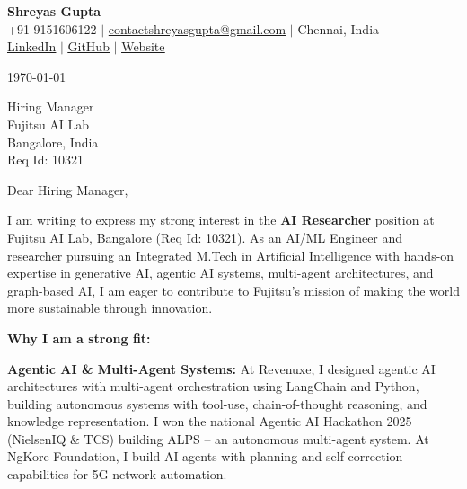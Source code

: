 \documentclass[11pt,letterpaper]{article}
\begin{document}
\begin{center}
    \textbf{\Large Shreyas Gupta} \\
    \vspace{4pt}
    +91 9151606122 $|$ \href{mailto:contactshreyasgupta@gmail.com}{contactshreyasgupta@gmail.com} $|$ Chennai, India \\
    \href{https://www.linkedin.com/in/contact-shreyas/}{\underline{LinkedIn}} $|$
    \href{https://github.com/contact-shreyas}{\underline{GitHub}} $|$
    \href{https://shreyas-gupta-portfolio-bvjtwuqfa-shreyas-projects-6592f999.vercel.app/}{\underline{Website}}
\end{center}

\vspace{14pt}

\noindent \today \\

\vspace{8pt}

\noindent Hiring Manager \\
Fujitsu AI Lab \\
Bangalore, India \\
Req Id: 10321 \\

\vspace{8pt}

\noindent Dear Hiring Manager, \\

\vspace{6pt}

\noindent I am writing to express my strong interest in the \textbf{AI Researcher} position at Fujitsu AI Lab, Bangalore (Req Id: 10321). As an AI/ML Engineer and researcher pursuing an Integrated M.Tech in Artificial Intelligence with hands-on expertise in generative AI, agentic AI systems, multi-agent architectures, and graph-based AI, I am eager to contribute to Fujitsu's mission of making the world more sustainable through innovation.

\vspace{4pt}

\noindent \textbf{Why I am a strong fit:}

\vspace{4pt}

\noindent \textbf{Agentic AI \& Multi-Agent Systems:} At Revenuxe, I designed agentic AI architectures with multi-agent orchestration using LangChain and Python, building autonomous systems with tool-use, chain-of-thought reasoning, and knowledge representation. I won the national Agentic AI Hackathon 2025 (NielsenIQ \& TCS) building ALPS -- an autonomous multi-agent system. At NgKore Foundation, I build AI agents with planning and self-correction capabilities for 5G network automation.
\end{document}
